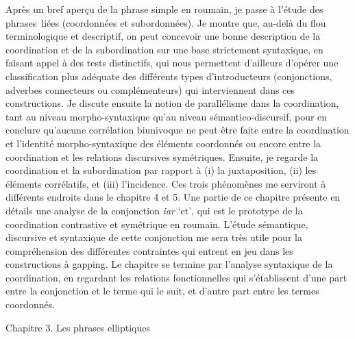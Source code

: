 Après un bref aperçu de la phrase simple en roumain, je passe à l'étude des phrases~liées (coordonnées et subordonnées). Je montre que, au-delà du flou terminologique et descriptif, on peut concevoir une bonne description de la coordination et de la subordination sur une base strictement syntaxique, en faisant appel à des tests distinctifs, qui nous permettent d'ailleurs d'opérer une classification plus adéquate des différents types d'introducteurs (conjonctions, adverbes connecteurs ou complémenteurs) qui interviennent dans ces constructions. Je discute ensuite la notion de parallélisme dans la coordination, tant au niveau morpho-syntaxique qu'au niveau sémantico-discursif, pour en conclure qu'aucune corrélation biunivoque ne peut être faite entre la coordination et l'identité morpho-syntaxique des éléments coordonnés ou encore entre la coordination et les relations discursives symétriques. Ensuite, je regarde la coordination et la subordination par rapport à (i) la juxtaposition, (ii) les éléments corrélatifs, et (iii) l'incidence. Ces trois phénomènes me serviront à différents endroits dans le chapitre 4 et 5. Une partie de ce chapitre présente en détails une analyse de la conjonction \textit{iar} `et', qui est le prototype de la coordination contrastive et symétrique en roumain. L'étude sémantique, discursive et syntaxique de cette conjonction me sera très utile pour la compréhension des différentes contraintes qui entrent en jeu dans les constructions à gapping. Le chapitre se termine par l'analyse syntaxique de la coordination, en regardant les relations fonctionnelles qui s'établissent d'une part entre la conjonction et le terme qui le suit, et d'autre part entre les termes coordonnés. 

Chapitre 3. Les phrases elliptiques


